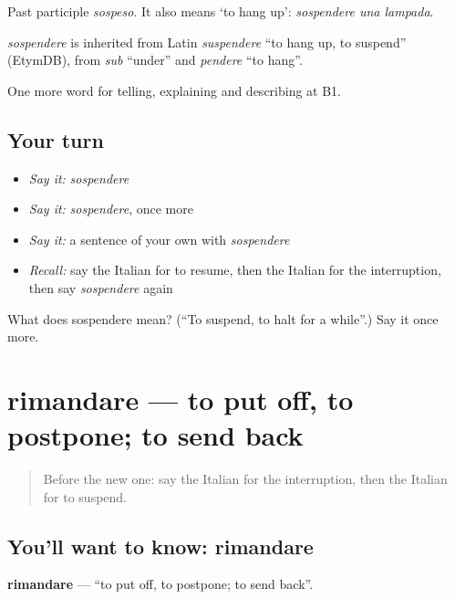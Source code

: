 Past participle \emph{sospeso}. It also means ‘to hang up’: \emph{sospendere una lampada}.

\begin{cousinweb}
\emph{sospendere} is inherited from Latin \emph{suspendere} \textquotedblleft{}to hang up, to suspend\textquotedblright{} (EtymDB), from \emph{sub} \textquotedblleft{}under\textquotedblright{} and \emph{pendere} \textquotedblleft{}to hang\textquotedblright{}.
\end{cousinweb}

\begin{grammarlens}[title={What you've built}]
One more word for telling, explaining and describing at B1.
\end{grammarlens}

\subsection*{Your turn}
\begin{itemize}
\raggedright
  \item \emph{Say it:} \emph{sospendere}
  \item \emph{Say it:} \emph{sospendere}, once more
  \item \emph{Say it:} a sentence of your own with \emph{sospendere}
  \item \emph{Recall:} say the Italian for to resume, then the Italian for the interruption, then say \emph{sospendere} again
\end{itemize}

\begin{tcolorbox}[breakable,colback=teal!4,colframe=teal!35!black,title={Before you move on}]
What does sospendere mean? (\textquotedblleft{}To suspend, to halt for a while\textquotedblright{}.) Say it once more.
\end{tcolorbox}
\section[rimandare]{rimandare — to put off, to postpone; to send back}

\label{lesson:IT-C279-rimandare}



\begin{quote}
Before the new one: say the Italian for the interruption, then the Italian for to suspend.
\end{quote}

\subsection*{You'll want to know: rimandare}
\textbf{rimandare} — \textquotedblleft{}to put off, to postpone; to send back\textquotedblright{}.

